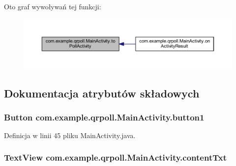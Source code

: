 Oto graf wywoływań tej funkcji\+:
\nopagebreak
\begin{figure}[H]
\begin{center}
\leavevmode
\includegraphics[width=350pt]{classcom_1_1example_1_1qrpoll_1_1_main_activity_ac108fe2528d7657f970d61d49639e6ac_icgraph}
\end{center}
\end{figure}




\subsection{Dokumentacja atrybutów składowych}
\hypertarget{classcom_1_1example_1_1qrpoll_1_1_main_activity_a3c62b040921525ab5c9944e97e08f639}{
\subsubsection[{button1}]{\setlength{\rightskip}{0pt plus 5cm}Button com.\+example.\+qrpoll.\+Main\+Activity.\+button1\hspace{0.3cm}{\ttfamily [private]}}}\label{classcom_1_1example_1_1qrpoll_1_1_main_activity_a3c62b040921525ab5c9944e97e08f639}


Definicja w linii 45 pliku Main\+Activity.\+java.

\hypertarget{classcom_1_1example_1_1qrpoll_1_1_main_activity_aee6c7adea75224ec647353db3ca58124}{
\subsubsection[{content\+Txt}]{\setlength{\rightskip}{0pt plus 5cm}Text\+View com.\+example.\+qrpoll.\+Main\+Activity.\+content\+Txt\hspace{0.3cm}{\ttfamily [package]}}}\label{classcom_1_1example_1_1qrpoll_1_1_main_activity_aee6c7adea75224ec647353db3ca58124}


